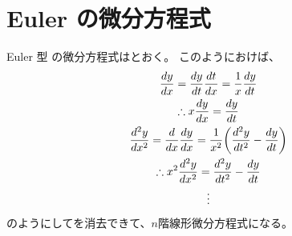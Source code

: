 \section{Euler の微分方程式}
Euler 型 
の微分方程式はとおく。
このようにおけば、
\begin{gather}
  \frac{dy}{dx}
  = \frac{dy}{dt}\frac{dt}{dx}
  =\frac{1}{x} \frac{dy}{dt} \\
  \therefore x\frac{dy}{dx} = \frac{dy}{dt} \\
  \frac{d^2y}{dx^2} = \frac{d}{dx}\frac{dy}{dx} = \frac{1}{x^2} \biggl(\frac{d^2y}{dt^2}-\frac{dy}{dt}\biggr) \\
  \therefore x^2\frac{d^2y}{dx^2} = \frac{d^2y}{dt^2} - \frac{dy}{dt} \\
  \vdots \notag
\end{gather}
のようにしてを消去できて、$n$階線形微分方程式になる。
